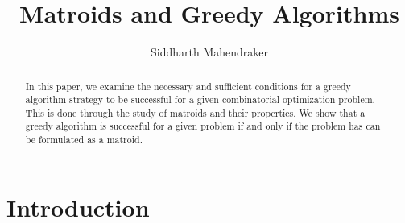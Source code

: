 \documentclass[a4paper,11pt]{report}
\theoremstyle{plain}
\theoremstyle{definition}
\begin{document}
\title{Matroids and Greedy Algorithms}
\author{Siddharth Mahendraker}

\maketitle

\begin{abstract}
In this paper, we examine the necessary and sufficient conditions for a
greedy algorithm strategy to be successful for a given combinatorial
optimization problem. This is done through the study of matroids and their
properties. We show that a greedy algorithm is successful for a given problem
if and only if the problem has can be formulated as a matroid.
\end{abstract}

\setcounter{secnumdepth}{3}
\renewcommand{\thesection}{\arabic{section}}

\renewcommand{\cfttoctitlefont}{\Large\bfseries}
\setlength\cftaftertoctitleskip{1em}

\setlength\cftbeforesecskip{0.5em}


\setcounter{page}{1}

\tableofcontents
\clearpage

\setcounter{page}{1}

\section{Introduction}
\end{document}
